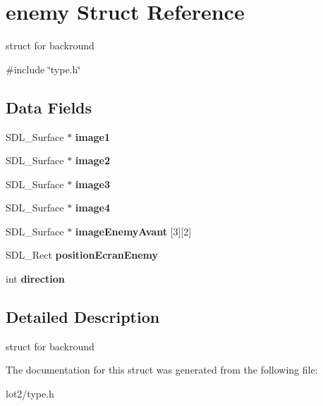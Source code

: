 \hypertarget{structenemy}{}\section{enemy Struct Reference}
\label{structenemy}


struct for backround  




{\ttfamily \#include \char`\"{}type.\+h\char`\"{}}

\subsection*{Data Fields}
\begin{DoxyCompactItemize}
\item 
S\+D\+L\+\_\+\+Surface $\ast$ {\bfseries image1}\hypertarget{structenemy_a95d99f3c8c142987c1667b352aff9645}{}\label{structenemy_a95d99f3c8c142987c1667b352aff9645}

\item 
S\+D\+L\+\_\+\+Surface $\ast$ {\bfseries image2}\hypertarget{structenemy_a9da85313d408136c35fb512e4b6a3c9c}{}\label{structenemy_a9da85313d408136c35fb512e4b6a3c9c}

\item 
S\+D\+L\+\_\+\+Surface $\ast$ {\bfseries image3}\hypertarget{structenemy_a326c9d9097a4126c0352a133b66cad79}{}\label{structenemy_a326c9d9097a4126c0352a133b66cad79}

\item 
S\+D\+L\+\_\+\+Surface $\ast$ {\bfseries image4}\hypertarget{structenemy_ab2a6c3af7dcda7a12b9e5214fcb9424c}{}\label{structenemy_ab2a6c3af7dcda7a12b9e5214fcb9424c}

\item 
S\+D\+L\+\_\+\+Surface $\ast$ {\bfseries image\+Enemy\+Avant} \mbox{[}3\mbox{]}\mbox{[}2\mbox{]}\hypertarget{structenemy_a06ee8a6870059b8eb9e69cd012e67fcb}{}\label{structenemy_a06ee8a6870059b8eb9e69cd012e67fcb}

\item 
S\+D\+L\+\_\+\+Rect {\bfseries position\+Ecran\+Enemy}\hypertarget{structenemy_ae89081bba474c910c1964fed335f6e06}{}\label{structenemy_ae89081bba474c910c1964fed335f6e06}

\item 
int {\bfseries direction}\hypertarget{structenemy_a6c1787380ba9a394339941a8e41a8737}{}\label{structenemy_a6c1787380ba9a394339941a8e41a8737}

\end{DoxyCompactItemize}


\subsection{Detailed Description}
struct for backround 

The documentation for this struct was generated from the following file\+:\begin{DoxyCompactItemize}
\item 
lot2/type.\+h\end{DoxyCompactItemize}
